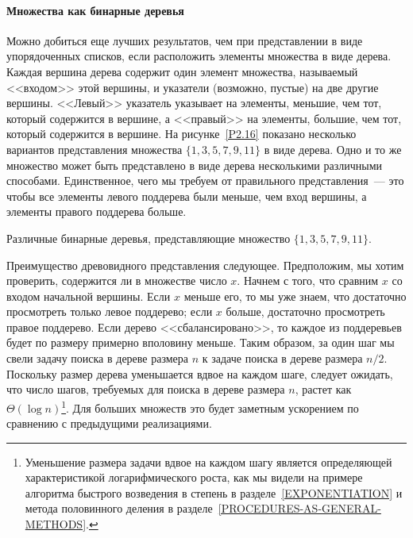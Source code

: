\paragraph{Множества как бинарные деревья}

% 
%
Можно добиться еще лучших результатов, чем при
представлении в виде упорядоченных списков, если расположить
элементы
множества в виде дерева. Каждая вершина дерева содержит один элемент
множества, называемый <<входом>> этой вершины, и указатели (возможно, 
пустые) на две другие вершины.  <<Левый>> указатель указывает на
элементы, меньшие, чем тот, который содержится в вершине, а <<правый>> 
на элементы, большие, чем тот, который содержится в вершине.  На
рисунке~\ref{P2.16}  показано несколько вариантов
представления множества $\{1, 3, 5, 7, 9, 11\}$ в виде
дерева.  Одно и то же множество может быть представлено в виде дерева
несколькими различными способами.  Единственное, чего мы требуем от
правильного представления~--- это чтобы все элементы левого поддерева
были меньше, чем вход вершины, а элементы правого поддерева
больше.


\begin{cntrfig}

\caption{Различные  бинарные деревья,
представляющие множество $\{1, 3, 5, 7, 9, 11\}$.}
\label{P2.16}

\end{cntrfig}

Преимущество древовидного представления следующее.
Предположим, мы хотим
проверить, содержится ли в множестве число 
$x$.  Начнем с того, что сравним $x$ со входом
начальной вершины.  Если $x$ меньше его, то мы уже знаем,
что достаточно просмотреть только левое поддерево; если $x$ 
больше, достаточно просмотреть правое поддерево.  Если дерево
<<сбалансировано>>, то каждое из поддеревьев будет по размеру примерно 
вполовину меньше. Таким образом, за один шаг мы свели задачу поиска в
дереве размера $n$ к задаче поиска в дереве размера $n 
/ 2$.  Поскольку размер дерева уменьшается вдвое на каждом
шаге, следует ожидать, что число шагов, требуемых для поиска в дереве
размера $n$, растет как $\Theta (\log n)$\footnote{Уменьшение размера задачи вдвое на каждом шагу
является определяющей характеристикой 
логарифмического роста, как мы
видели на примере алгоритма быстрого возведения в степень в разделе~\ref{EXPONENTIATION} и метода половинного
деления в разделе~\ref{PROCEDURES-AS-GENERAL-METHODS}.
}.
Для больших множеств это будет заметным ускорением по сравнению с
предыдущими реализациями.


